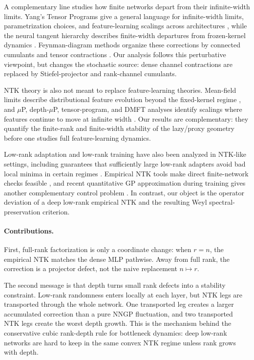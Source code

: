 \documentclass{article}
\begin{document}
A complementary line studies how finite networks depart from their infinite-width limits. Yang's Tensor Programs give a general language for infinite-width limits, parametrization choices, and feature-learning scalings across architectures \citep{Yang2019,Yang2021,Yang2022MuP,YangDepthMuP2024}, while the neural tangent hierarchy describes finite-width departures from frozen-kernel dynamics \citep{Huang2020}. Feynman-diagram methods organize these corrections by connected cumulants and tensor contractions \citep{DyerGurAri2019,FeynmanNTK2025}. Our analysis follows this perturbative viewpoint, but changes the stochastic source: dense channel contractions are replaced by Stiefel-projector and rank-channel cumulants.

NTK theory is also not meant to replace feature-learning theories. Mean-field limits describe distributional feature evolution beyond the fixed-kernel regime \citep{MeiMontanariNguyen2018,ChizatBach2018,RotskoffVandenEijnden2018}, and \(\mu\)P, depth-\(\mu\)P, tensor-program, and DMFT analyses identify scalings where features continue to move at infinite width \citep{Yang2022MuP,YangDepthMuP2024,BordelonPehlevan2022}. Our results are complementary: they quantify the finite-rank and finite-width stability of the lazy/proxy geometry before one studies full feature-learning dynamics.

Low-rank adaptation and low-rank training have also been analyzed in NTK-like settings, including guarantees that sufficiently large low-rank adapters avoid bad local minima in certain regimes \citep{JangLeeRyu2024LoRA}. Empirical NTK tools make direct finite-network checks feasible \citep{Novak2022}, and recent quantitative GP approximation during training gives another complementary control problem \citep{MosigGarciaAgazziTrevisan2025}. In contrast, our object is the operator deviation of a deep low-rank empirical NTK and the resulting Weyl spectral-preservation criterion.

\paragraph{Contributions.}
First, full-rank factorization is only a coordinate change: when \(r=n\), the empirical NTK matches the dense MLP pathwise. Away from full rank, the correction is a projector defect, not the naive replacement \(n\mapsto r\).

The second message is that depth turns small rank defects into a stability constraint. Low-rank randomness enters locally at each layer, but NTK legs are transported through the whole network. One transported leg creates a larger accumulated correction than a pure NNGP fluctuation, and two transported NTK legs create the worst depth growth. This is the mechanism behind the conservative cubic rank-depth rule for bottleneck dynamics: deep low-rank networks are hard to keep in the same convex NTK regime unless rank grows with depth.
\end{document}
